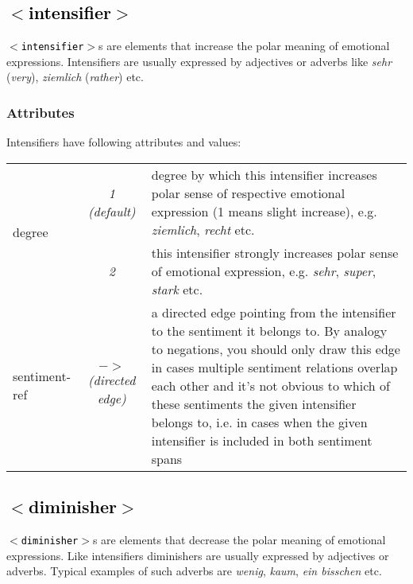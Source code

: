 \documentclass[11pt,a4paper]{article}
\newcommand{\xmltag}[1]{\textcolor{black}{{\small$<$#1$>$}}}
\begin{document}
\subsection{\xmltag{intensifier}}
\texttt{\xmltag{intensifier}}s are elements that increase the polar
meaning of emotional expressions. Intensifiers are usually expressed
by adjectives or adverbs like \textit{sehr} (\textit{very}),
\textit{ziemlich} (\textit{rather}) etc.

\subsubsection{Attributes}
Intensifiers have following attributes and values:

\begin{tabular}{|l|c|p{}|}\hline
  \multirow{2}{*}{degree} & \textit{1 (default)} & degree by which
  this intensifier increases polar sense of respective emotional
  expression (1 means slight increase), e.g. \textit{ziemlich},
  \textit{recht} etc.\\\cline{2-3}

  & \textit{2} & this intensifier strongly increases polar sense of
  emotional expression, e.g. \textit{sehr}, \textit{super},
  \textit{stark} etc.\\\hline


  sentiment-ref & \textit{$->$\newline(directed edge)} & a directed
  edge pointing from the intensifier to the sentiment it belongs to. By
  analogy to negations, you should only draw this edge in cases multiple sentiment relations overlap each other and it's not
  obvious to which of these sentiments the given intensifier belongs to,
  i.e. in cases when the given intensifier is included in both sentiment
  spans\\\hline
\end{tabular}


\subsection{\xmltag{diminisher}}
\texttt{\xmltag{diminisher}}s are elements that decrease the polar
meaning of emotional expressions. Like intensifiers diminishers are
usually expressed by adjectives or adverbs. Typical examples of such
adverbs are \textit{wenig}, \textit{kaum}, \textit{ein bisschen} etc.
\end{document}
